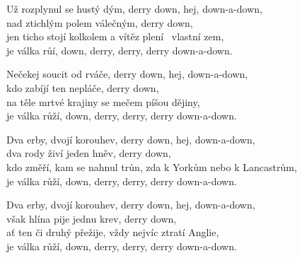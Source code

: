 
\ve{}
Už rozplynul se hustý dým, derry down, hej, down-a-down,\\
nad ztichlým polem válečným, derry down,\quad {}\\ 
jen ticho stojí kolkolem a vítěz plení \qquad \ vlastní zem,\\
je válka růí, down, derry, derry, derry down-a-down. 

\ve{}
Nečekej soucit od rváče, derry down, hej, down-a-down,\\
kdo zabíjí ten nepláče, derry down,\\
na těle mrtvé krajiny se mečem píšou dějiny,\\
je válka růží, down, derry, derry, derry down-a-down. 

\ve{}
Dva erby, dvojí korouhev, derry down, hej, down-a-down,\\
dva rody živí jeden hněv, derry down,\\
kdo změří, kam se nahnul trůn, zda k Yorkům nebo k Lancastrům,\\
je válka růží, down, derry, derry, derry down-a-down. 

\ve{}
Dva erby, dvojí korouhev, derry down, hej, down-a-down,\\
však hlína pije jednu krev, derry down,\\
ať ten či druhý přežije, vždy nejvíc ztratí Anglie,\\
je válka růží, down, derry, derry, derry down-a-down.

\esong